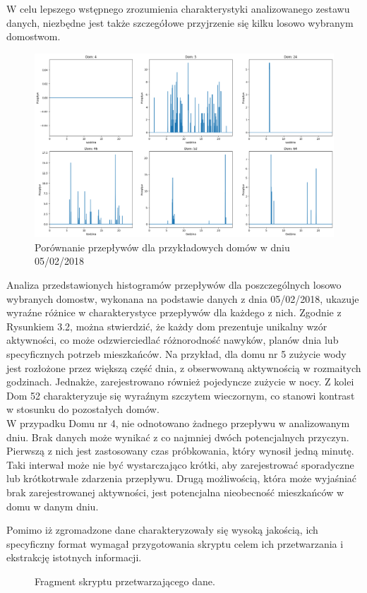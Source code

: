 \documentclass[a4paper,twoside,12pt]{book}
\begin{document}
\newpage
W celu lepszego wstępnego zrozumienia charakterystyki analizowanego zestawu danych, niezbędne jest także szczegółowe przyjrzenie się kilku losowo wybranym domostwom.
\begin{figure}[!h]
	\centering
	\includegraphics[width=1\textwidth]{img/Dane_nowe_compare.png}
	\caption{Porównanie przepływów dla przykładowych domów w dniu 05/02/2018}
	\label{fig:etykieta-rysunku}
\end{figure}
Analiza przedstawionych histogramów przepływów dla poszczególnych losowo wybranych domostw, wykonana na podstawie danych z dnia 05/02/2018, ukazuje wyraźne różnice w charakterystyce przepływów dla każdego z nich. Zgodnie z Rysunkiem 3.2, można stwierdzić, że każdy dom prezentuje unikalny wzór aktywności, co może odzwierciedlać różnorodność nawyków, planów dnia lub specyficznych potrzeb mieszkańców. Na przykład, dla domu nr 5 zużycie wody jest rozłożone przez większą część dnia, z obserwowaną aktywnością w rozmaitych godzinach. Jednakże, zarejestrowano również pojedyncze zużycie w nocy. Z kolei Dom 52 charakteryzuje się wyraźnym szczytem wieczornym, co stanowi kontrast w stosunku do pozostałych domów.\\W przypadku Domu nr 4, nie odnotowano żadnego przepływu w analizowanym dniu. Brak danych może wynikać z co najmniej dwóch potencjalnych przyczyn. Pierwszą z nich jest zastosowany czas próbkowania, który wynosił jedną minutę. Taki interwał może nie być wystarczająco krótki, aby zarejestrować sporadyczne lub krótkotrwałe zdarzenia przepływu. Drugą możliwością, która może wyjaśniać brak zarejestrowanej aktywności, jest potencjalna nieobecność mieszkańców w domu w danym dniu.

\newpage
Pomimo iż zgromadzone dane charakteryzowały się wysoką jakością, ich specyficzny format wymagał przygotowania skryptu celem ich przetwarzania i ekstrakcję istotnych informacji.\\
\begin{figure}[!h]
	\centering
	
	\caption{Fragment skryptu przetwarzającego dane.}
	\label{fig:pseudokod:listings}
\end{figure}
\end{document}
